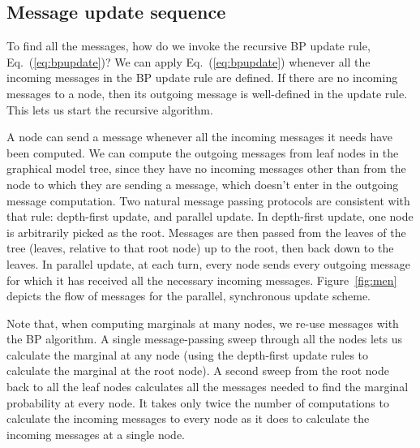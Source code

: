 \subsection{Message update sequence}
To find all the messages, how do we invoke the recursive BP update rule, Eq.~(\ref{eq:bpupdate})?  We can apply Eq.~(\ref{eq:bpupdate})
whenever all the incoming messages in the BP update rule are defined.  If there
 are no incoming messages to a node, then its outgoing message is
well-defined in the update rule.  This lets us start the recursive algorithm.

A node can send a message whenever all the incoming messages it needs
have been computed.  We can compute the outgoing messages
from leaf nodes in the graphical model tree, since they have no
incoming messages other than from the node to which they are sending a
message, which doesn't enter in the outgoing message computation.  Two
natural message passing protocols are consistent with that rule:
depth-first update, and parallel update.  In depth-first update, one
node is arbitrarily picked as the root.  Messages are then passed from
the leaves of the tree (leaves, relative to that root node) up to the
root, then back down to the leaves.  In parallel update, at each turn,
every node sends every outgoing message for which it has received all
the necessary incoming messages.  Figure~\ref{fig:men} depicts the
flow of messages for the parallel, synchronous update scheme.

Note that, when computing marginals at many nodes, we re-use messages
with the BP algorithm.  A single message-passing sweep through all the
nodes lets us calculate the marginal at any node (using the
depth-first update rules to calculate the marginal at the root node).
A second sweep from the root node back to all the leaf nodes
calculates all the messages needed to find the marginal probability at
every node.  It takes only twice the number of computations to
calculate the incoming messages to every node as it does to
calculate the incoming messages at a single node.

